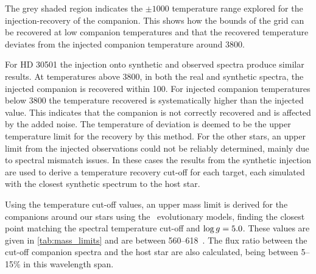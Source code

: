 The grey shaded region indicates the \(\pm 1000\)\K{} temperature range explored for the injection-recovery of the companion.
This shows how the bounds of the grid can be recovered at low companion temperatures and that the recovered temperature deviates from the injected companion temperature around 3800\K{}.

For {HD 30501} the injection onto synthetic and observed spectra produce similar results.
At temperatures above 3800\K{}, in both the real and synthetic spectra, the injected companion is recovered within 100\K{}.
For injected companion temperatures below 3800\K{} the temperature recovered is systematically higher than the injected value.
This indicates that the companion is not correctly recovered and is affected by the added noise.
The temperature of deviation is deemed to be the upper temperature limit for the recovery by this method.
For the other stars, an upper limit from the injected observations could not be reliably determined, mainly due to spectral mismatch issues.
In these cases the results from the synthetic injection are used to derive a temperature recovery cut-off for each target, each simulated with the closest synthetic spectrum to the host star.

Using the temperature cut-off values, an upper mass limit is derived for the companions around our stars using the~\citet{baraffe_new_2015} evolutionary models, finding the closest point matching the spectral temperature cut-off and \(\log{g}{}=5.0\).
These values are given in \cref{tab:mass_limits} and are between 560--618~\Mjup{}.
The flux ratio between the cut-off companion spectra and the host star are also calculated, being between 5--15\% in this wavelength span.



